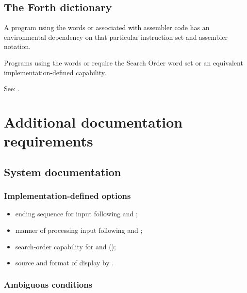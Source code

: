 \subsection{The Forth dictionary} %
\label{tools:dict}

A program using the words  or  associated
with assembler code has an environmental dependency on that
particular instruction set and assembler notation.

Programs using the words  or  require
the Search Order word set or an equivalent implementation-defined
capability.

See: .

\section{Additional documentation requirements} %

\subsection{System documentation} %

\subsubsection{Implementation-defined options} %

\begin{itemize}
\item ending sequence for input following
	 and
	;
\item manner of processing input following
	 and
	;
\item search-order capability for
	 and
	();
\item source and format of display by .
\end{itemize}

\subsubsection{Ambiguous conditions} %
\label{tools:ambiguous}

